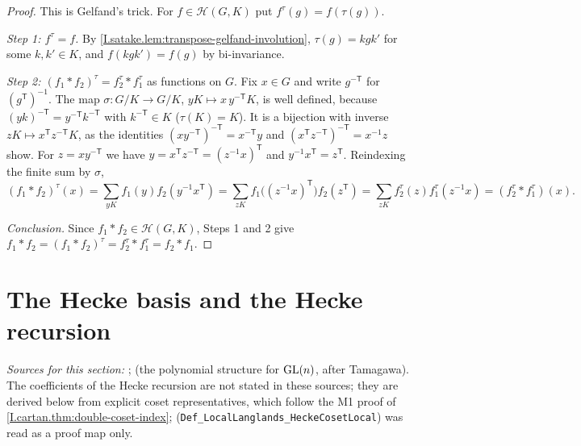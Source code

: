 \begin{theorem}
\end{theorem}
\begin{proof}
This is Gelfand's trick. For $f\in\mathcal H(G,K)$ put $f^\tau(g)=f(\tau(g))$.

\emph{Step 1: $f^\tau=f$.} By \cref{I.satake.lem:transpose-gelfand-involution}, $\tau(g)=kgk'$ for some $k,k'\in K$,
and $f(kgk')=f(g)$ by bi-invariance.

\emph{Step 2: $(f_1*f_2)^\tau=f_2^\tau*f_1^\tau$} as functions on $G$. Fix $x\in G$ and write $g^{-\mathsf T}$ for
$(g^{\mathsf T})^{-1}$. The map $\sigma\colon G/K\to G/K$, $yK\mapsto x\,y^{-\mathsf T}K$, is well defined, because
$(yk)^{-\mathsf T}=y^{-\mathsf T}k^{-\mathsf T}$ with $k^{-\mathsf T}\in K$ ($\tau(K)=K$). It is a bijection with inverse
$zK\mapsto x^{\mathsf T}z^{-\mathsf T}K$, as the identities $(xy^{-\mathsf T})^{-\mathsf T}=x^{-\mathsf T}y$ and
$(x^{\mathsf T}z^{-\mathsf T})^{-\mathsf T}=x^{-1}z$ show. For $z=xy^{-\mathsf T}$ we have
$y=x^{\mathsf T}z^{-\mathsf T}=(z^{-1}x)^{\mathsf T}$ and $y^{-1}x^{\mathsf T}=z^{\mathsf T}$. Reindexing the finite sum
by $\sigma$,
\[
  (f_1*f_2)^\tau(x)=\sum_{yK}f_1(y)f_2(y^{-1}x^{\mathsf T})
  =\sum_{zK}f_1\bigl((z^{-1}x)^{\mathsf T}\bigr)f_2(z^{\mathsf T})
  =\sum_{zK}f_2^\tau(z)f_1^\tau(z^{-1}x)=(f_2^\tau*f_1^\tau)(x).
\]

\emph{Conclusion.} Since $f_1*f_2\in\mathcal H(G,K)$, Steps 1 and 2 give
$f_1*f_2=(f_1*f_2)^\tau=f_2^\tau*f_1^\tau=f_2*f_1$.
\end{proof}

\section{The Hecke basis and the Hecke recursion}\label{sec:satake-basis}

{\sloppy\noindent\emph{Sources for this section:} \cite[§9, Proposition~35 (Cartan decomposition), Proposition~36,
the basis $\theta_\lambda$ and Proposition~37 with its proof, pp.~49--53]{BumpH}; \cite[§8.3, Theorem~6\,(i),
p.~45]{Sat} (the polynomial structure for $\mathrm{GL}(n)$, after Tamagawa). The coefficients of the Hecke recursion are not
stated in these sources; they are derived below from explicit coset representatives, which follow the M1 proof of
\cref{I.cartan.thm:double-coset-index}; \cite{AFLT} (\texttt{Def\_LocalLanglands\_\allowbreak HeckeCosetLocal}) was
read as a proof map only.\par}


